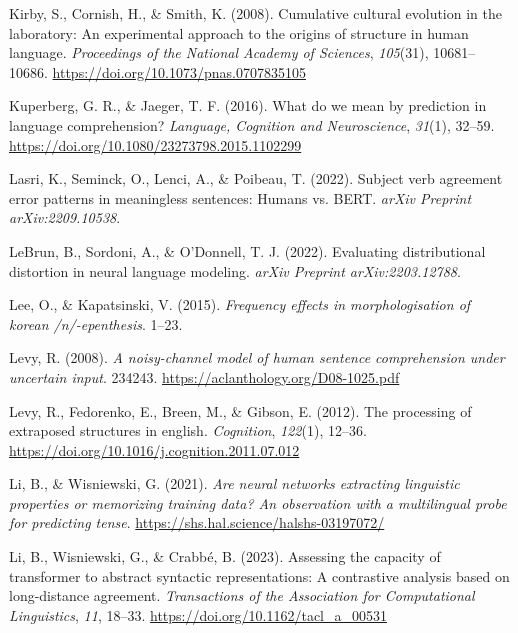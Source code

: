 \documentclass[
  12pt,
  letterpaper,
]{scrreprt}
\newlength{\cslhangindent}
\newenvironment{CSLReferences}[2] %
 {\begin{list}{}{%
  \setlength{\itemindent}{0pt}
  \setlength{\leftmargin}{0pt}
  \setlength{\parsep}{0pt}
  \ifodd #1
   \setlength{\leftmargin}{\cslhangindent}
   \setlength{\itemindent}{-1\cslhangindent}
  \fi
  \setlength{\itemsep}{#2\baselineskip}}}
 {\end{list}}
\begin{document}
\begin{CSLReferences}{1}{0}
Kirby, S., Cornish, H., \& Smith, K. (2008). Cumulative cultural
evolution in the laboratory: An experimental approach to the origins of
structure in human language. \emph{Proceedings of the National Academy
of Sciences}, \emph{105}(31), 10681--10686.
\url{https://doi.org/10.1073/pnas.0707835105}

Kuperberg, G. R., \& Jaeger, T. F. (2016). What do we mean by prediction
in language comprehension? \emph{Language, Cognition and Neuroscience},
\emph{31}(1), 32--59.
\url{https://doi.org/10.1080/23273798.2015.1102299}

Lasri, K., Seminck, O., Lenci, A., \& Poibeau, T. (2022). Subject verb
agreement error patterns in meaningless sentences: Humans vs. BERT.
\emph{arXiv Preprint arXiv:2209.10538}.

LeBrun, B., Sordoni, A., \& O'Donnell, T. J. (2022). Evaluating
distributional distortion in neural language modeling. \emph{arXiv
Preprint arXiv:2203.12788}.

Lee, O., \& Kapatsinski, V. (2015). \emph{Frequency effects in
morphologisation of korean /n/-epenthesis}. 1--23.

Levy, R. (2008). \emph{A noisy-channel model of human sentence
comprehension under uncertain input}. 234243.
\url{https://aclanthology.org/D08-1025.pdf}

Levy, R., Fedorenko, E., Breen, M., \& Gibson, E. (2012). The processing
of extraposed structures in english. \emph{Cognition}, \emph{122}(1),
12--36. \url{https://doi.org/10.1016/j.cognition.2011.07.012}

Li, B., \& Wisniewski, G. (2021). \emph{Are neural networks extracting
linguistic properties or memorizing training data? An observation with a
multilingual probe for predicting tense}.
\url{https://shs.hal.science/halshs-03197072/}

Li, B., Wisniewski, G., \& Crabbé, B. (2023). Assessing the capacity of
transformer to abstract syntactic representations: A contrastive
analysis based on long-distance agreement. \emph{Transactions of the
Association for Computational Linguistics}, \emph{11}, 18--33.
\url{https://doi.org/10.1162/tacl_a_00531}


\end{CSLReferences}
\end{document}
